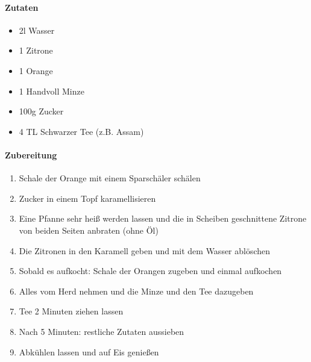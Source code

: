 \clearpage
{}
\paragraph{Zutaten}
\begin{itemize}[noitemsep]
	\item 2l Wasser
	\item 1 Zitrone
	\item 1 Orange
	\item 1 Handvoll Minze
	\item 100g Zucker
	\item 4 TL Schwarzer Tee (z.B. Assam)
\end{itemize}

\paragraph{Zubereitung}
\begin{enumerate}[noitemsep]
	\item Schale der Orange mit einem Sparschäler schälen
	\item Zucker in einem Topf karamellisieren
	\item Eine Pfanne sehr heiß werden lassen und die in Scheiben geschnittene Zitrone von beiden Seiten anbraten (ohne Öl)
	\item Die Zitronen in den Karamell geben und mit dem Wasser ablöschen
	\item Sobald es aufkocht: Schale der Orangen zugeben und einmal aufkochen 
	\item Alles vom Herd nehmen und die Minze und den Tee dazugeben
	\item Tee 2 Minuten ziehen lassen 
	\item Nach 5 Minuten: restliche Zutaten aussieben
	\item Abkühlen lassen und auf Eis genießen
\end{enumerate}
